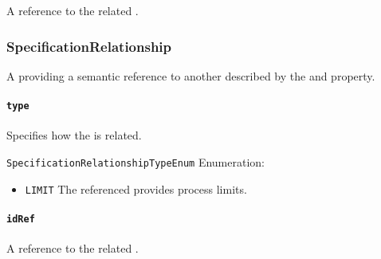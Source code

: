 \newline A reference to the related  .


\subsubsection{SpecificationRelationship}
\label{sec:SpecificationRelationship}



A  providing a semantic reference to another  described by the  and  property.


\paragraph{\texttt{type}}\mbox{}


\newline Specifies how the  is related.

\texttt{SpecificationRelationshipTypeEnum} Enumeration:

\begin{itemize}
\item \texttt{LIMIT} \newline The referenced  provides process limits.
 
\end{itemize}


\paragraph{\texttt{idRef}}\mbox{}


\newline A reference to the related  .

